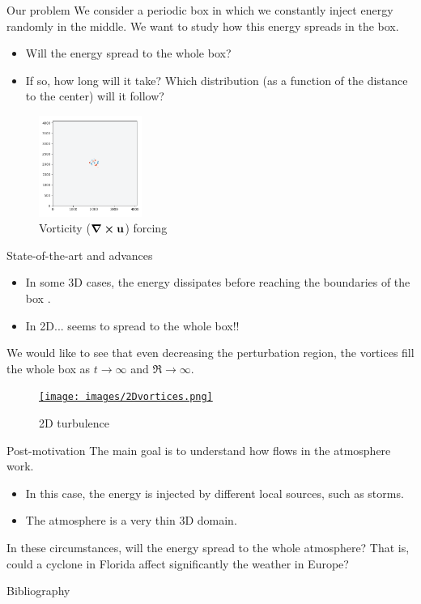 \documentclass{beamer} %
\begin{document}
\begin{frame}{Our problem}
	We consider a periodic box in which we constantly inject energy randomly in the middle. We want to study how this energy spreads in the box.
	\begin{itemize}
		\item Will the energy spread to the whole box?
		\item If so, how long will it take? Which distribution (as a function of the distance to the center) will it follow?
	\end{itemize}
	\begin{figure}
		\centering
		\includegraphics[width=0.3\textwidth]{images/FlowD_fw.002.png}
		\caption{Vorticity ($\curl \boldsymbol{\mathrm{u}}$) forcing}
		\label{fig:forcing}
	\end{figure}
\end{frame}
\begin{frame}{State-of-the-art and advances}
	\begin{itemize}
		\item In some 3D cases, the energy dissipates before reaching the boundaries of the box \cite{alexakis}.
		\item In 2D... seems to spread to the whole box!!
	\end{itemize}
	We would like to see that even decreasing the perturbation region, the vortices fill the whole box as $t\to\infty$ and $\Re\to\infty$.
	\begin{figure}
		\centering
		\href{run:./videos/Re64.mp4}{
			\texttt{[image: images/2Dvortices.png]}
		}
		\caption{2D turbulence}
		\label{fig:my2D}
	\end{figure}
\end{frame}
\begin{frame}{Post-motivation}
	The main goal is to understand how flows in the atmosphere work.
	\begin{itemize}
		\item In this case, the energy is injected by different local sources, such as storms.
		\item The atmosphere is a very thin 3D domain.
	\end{itemize}
	In these circumstances, will the energy spread to the whole atmosphere? That is, could a cyclone in Florida affect significantly the weather in Europe?
\end{frame}

\begin{frame}{Bibliography}
	\printbibliography
\end{frame}
\end{document}
